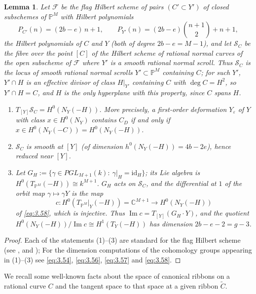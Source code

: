 \documentclass[11pt,twoside]{amsart}
\theoremstyle{plain}
\newtheorem{lemma}[theorem]{Lemma}
\theoremstyle{definition}
\newcommand{\PM}{\mathbb{P}^M}
\renewcommand{\Im}{\operatorname{Im}}
\newcommand{\id}{\mathrm{id}}
\newcommand{\NY}{N_{Y}}
\newcommand{\TP}{T_{\PM}|_Y}
\newcommand{\SC}{\mathcal{S}_C}
\newcommand{\GH}{G_H}
\newcommand{\Dd}{D}
\begin{document}

\begin{lemma}\label{lem:SC}
Let $\mathcal F$ be the flag Hilbert scheme of pairs $(C'\subset Y')$ of closed subschemes of $\PM$ with Hilbert polynomials
\[
P_{C'}(n)=(2b-e)\,n+1,\qquad P_{Y'}(n)=(2b-e)\binom{n+1}{2}+n+1,
\]
the Hilbert polynomials of $C$ and $Y$ (both of degree $2b-e=M-1$), and let $\SC$ be the fibre over the point $[C]$ of the Hilbert scheme of rational normal curves of the open subscheme of $\mathcal F$ where $Y'$ is a smooth rational normal scroll. Thus $\SC$ is the locus of smooth rational normal scrolls $Y'\subset\PM$ containing $C$; for such $Y'$, $Y'\cap H$ is an effective divisor of class $H|_{Y'}$ containing $C$ with $\deg C=H^2$, so $Y'\cap H=C$, and $H$ is the only hyperplane with this property, since $C$ spans $H$.
\begin{enumerate}
\item $T_{[Y]}\SC=H^0(\NY(-H))$. More precisely, a first-order deformation $Y_\varepsilon$ of $Y$ with class $x\in H^0(\NY)$ contains $C_\Dd$ if and only if $x\in H^0(\NY(-C))=H^0(\NY(-H))$.
\item $\SC$ is smooth at $[Y]$ (of dimension $h^0(\NY(-H))=4b-2e$), hence reduced near $[Y]$.
\item Let $\GH:=\{\gamma\in PGL_{M+1}(k):\ \gamma|_H=\id_H\}$; its Lie algebra is $H^0(T_{\PM}(-H))\cong k^{M+1}$. $\GH$ acts on $\SC$, and the differential at $1$ of the orbit map $\gamma\mapsto\gamma Y$ is the map
\[
c\colon H^0(\TP(-H))=\mathbb{C}^{M+1}\longrightarrow H^0(\NY(-H))
\]
of \eqref{eq:3.58}, which is injective. Thus $\Im c=T_{[Y]}(\GH\cdot Y)$, and the quotient $H^0(\NY(-H))/\Im c\cong H^1(T_Y(-H))$ has dimension $2b-e-2=g-3$.
\end{enumerate}
\end{lemma}

\begin{proof}
Each of the statements (1)--(3) are standard for the flag Hilbert scheme (see \cite{Kle81}, \cite[\S4.5]{Ser06} and \cite{CLM93}); For the dimension computations of the cohomology groups appearing in (1)--(3) see \eqref{eq:3.54}, \eqref{eq:3.56}, \eqref{eq:3.57} and \eqref{eq:3.58}.    
\end{proof}


We recall some well-known facts about the space of canonical ribbons on a rational curve $C$ and the tangent space to that space at a given ribbon $\widetilde{C}$.
\end{document}

